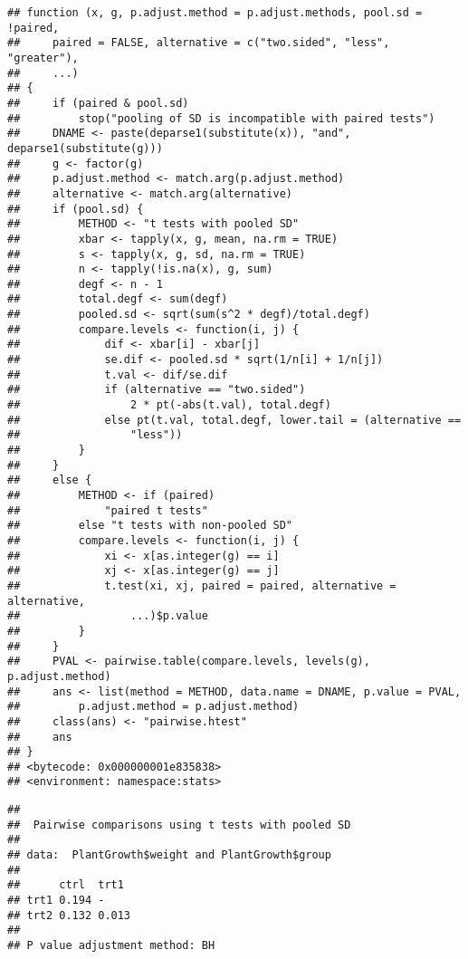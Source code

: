 \documentclass[
]{article}
\newenvironment{Shaded}{\begin{snugshade}}{\end{snugshade}}
\newcommand{\AttributeTok}[1]{\textcolor[rgb]{0.77,0.63,0.00}{#1}}
\newcommand{\FunctionTok}[1]{\textcolor[rgb]{0.00,0.00,0.00}{#1}}
\newcommand{\NormalTok}[1]{#1}
\newcommand{\SpecialCharTok}[1]{\textcolor[rgb]{0.00,0.00,0.00}{#1}}
\newcommand{\StringTok}[1]{\textcolor[rgb]{0.31,0.60,0.02}{#1}}
\begin{document}
\begin{verbatim}
## function (x, g, p.adjust.method = p.adjust.methods, pool.sd = !paired, 
##     paired = FALSE, alternative = c("two.sided", "less", "greater"), 
##     ...) 
## {
##     if (paired & pool.sd) 
##         stop("pooling of SD is incompatible with paired tests")
##     DNAME <- paste(deparse1(substitute(x)), "and", deparse1(substitute(g)))
##     g <- factor(g)
##     p.adjust.method <- match.arg(p.adjust.method)
##     alternative <- match.arg(alternative)
##     if (pool.sd) {
##         METHOD <- "t tests with pooled SD"
##         xbar <- tapply(x, g, mean, na.rm = TRUE)
##         s <- tapply(x, g, sd, na.rm = TRUE)
##         n <- tapply(!is.na(x), g, sum)
##         degf <- n - 1
##         total.degf <- sum(degf)
##         pooled.sd <- sqrt(sum(s^2 * degf)/total.degf)
##         compare.levels <- function(i, j) {
##             dif <- xbar[i] - xbar[j]
##             se.dif <- pooled.sd * sqrt(1/n[i] + 1/n[j])
##             t.val <- dif/se.dif
##             if (alternative == "two.sided") 
##                 2 * pt(-abs(t.val), total.degf)
##             else pt(t.val, total.degf, lower.tail = (alternative == 
##                 "less"))
##         }
##     }
##     else {
##         METHOD <- if (paired) 
##             "paired t tests"
##         else "t tests with non-pooled SD"
##         compare.levels <- function(i, j) {
##             xi <- x[as.integer(g) == i]
##             xj <- x[as.integer(g) == j]
##             t.test(xi, xj, paired = paired, alternative = alternative, 
##                 ...)$p.value
##         }
##     }
##     PVAL <- pairwise.table(compare.levels, levels(g), p.adjust.method)
##     ans <- list(method = METHOD, data.name = DNAME, p.value = PVAL, 
##         p.adjust.method = p.adjust.method)
##     class(ans) <- "pairwise.htest"
##     ans
## }
## <bytecode: 0x000000001e835838>
## <environment: namespace:stats>
\end{verbatim}

\begin{Shaded}
\end{Shaded}

\begin{verbatim}
## 
##  Pairwise comparisons using t tests with pooled SD 
## 
## data:  PlantGrowth$weight and PlantGrowth$group 
## 
##      ctrl  trt1 
## trt1 0.194 -    
## trt2 0.132 0.013
## 
## P value adjustment method: BH
\end{verbatim}
\end{document}
